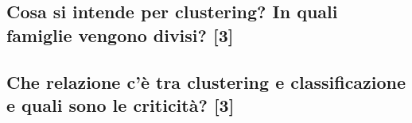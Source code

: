 \documentclass[\main/main.tex]{subfiles}
\begin{document}
\subsection{Cosa si intende per clustering? In quali famiglie vengono divisi? [3]}
\subsection{Che relazione c'è tra clustering e classificazione e quali sono le criticità? [3]}
\end{document}
